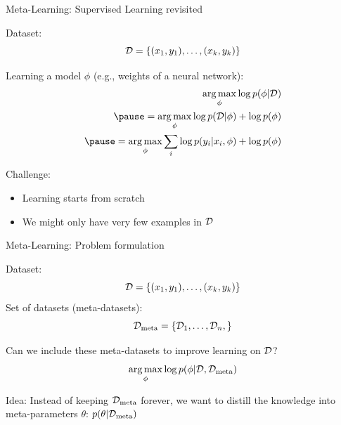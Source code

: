 \begin{frame}[c]{Meta-Learning: Supervised Learning revisited}

Dataset:
\begin{equation*}
\mathcal{D} = \{(x_1, y_1), \ldots, (x_k, y_k) \}
\end{equation*}

\bigskip
\pause

Learning a model $\phi$ (e.g., weights of a neural network):
\begin{eqnarray*}
\argmax_{\phi} \log p(\phi|\dataset)\\
\pause
= \argmax_{\phi} \log p(\dataset | \phi) + \log p(\phi) \\
\pause
= \argmax_{\phi} \sum_i \log p(y_i | x_i, \phi) + \log p(\phi)
\end{eqnarray*}

\pause

Challenge:
\begin{itemize}
	\item Learning starts from scratch
	\item We might only have very few examples in $\mathcal{D}$ 
\end{itemize}

\end{frame}
\begin{frame}[c]{Meta-Learning: Problem formulation}

Dataset:
\begin{equation*}
\mathcal{D} = \{(x_1, y_1), \ldots, (x_k, y_k) \}
\end{equation*}
Set of datasets (meta-datasets):
\begin{equation*}
\mathcal{D}_{\text{meta}} = \{\mathcal{D}_1, \ldots, \mathcal{D}_n, \}
\end{equation*}

\pause
Can we include these meta-datasets to improve learning on $\mathcal{D}$?
\begin{equation*}
\operatorname*{arg\,max}_{\phi} \log p(\phi|\mathcal{D}, \mathcal{D}_{\text{meta}})
\end{equation*}

\pause
\medskip

\alert{Idea:} Instead of keeping $\mathcal{D}_{\text{meta}}$ forever, we want to distill the knowledge into \alert{meta-parameters $\theta$}: $p(\theta|\mathcal{D}_{\text{meta}})$
 
\end{frame}
